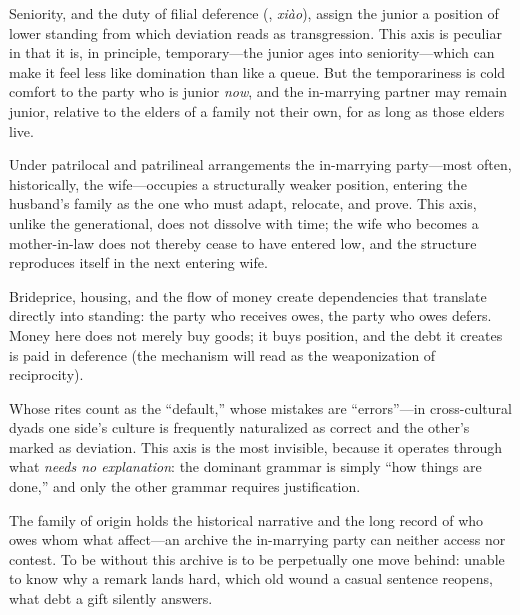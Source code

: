  Seniority, and the duty of filial deference (, \emph{xiào}), assign the junior a position of lower standing from which deviation reads as transgression. This axis is peculiar in that it is, in principle, temporary---the junior ages into seniority---which can make it feel less like domination than like a queue. But the temporariness is cold comfort to the party who is junior \emph{now}, and the in-marrying partner may remain junior, relative to the elders of a family not their own, for as long as those elders live.

 Under patrilocal and patrilineal arrangements the in-marrying party---most often, historically, the wife---occupies a structurally weaker position, entering the husband's family as the one who must adapt, relocate, and prove. This axis, unlike the generational, does not dissolve with time; the wife who becomes a mother-in-law does not thereby cease to have entered low, and the structure reproduces itself in the next entering wife.

 Brideprice, housing, and the flow of money create dependencies that translate directly into standing: the party who receives owes, the party who owes defers. Money here does not merely buy goods; it buys position, and the debt it creates is paid in deference (the mechanism  will read as the weaponization of reciprocity).

 Whose rites count as the ``default,'' whose mistakes are ``errors''---in cross-cultural dyads one side's culture is frequently naturalized as correct and the other's marked as deviation. This axis is the most invisible, because it operates through what \emph{needs no explanation}: the dominant grammar is simply ``how things are done,'' and only the other grammar requires justification.

 The family of origin holds the historical narrative and the long record of who owes whom what affect---an archive the in-marrying party can neither access nor contest. To be without this archive is to be perpetually one move behind: unable to know why a remark lands hard, which old wound a casual sentence reopens, what debt a gift silently answers.

